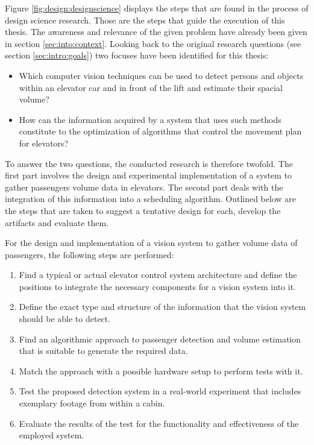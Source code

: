 Figure \ref{fig:design:designscience} displays the steps that are found in the process of design science research. 
Those are the steps that guide the execution of this thesis.
The awareness and relevance of the given problem have already been given in section \vref{sec:into:context}.
Looking back to the original research questions (see section \vref{sec:intro:goals}) two focuses have been identified for this thesis:

\begin{itemize}
    \item Which computer vision techniques can be used to detect persons and objects within an elevator car and in front of the lift and estimate their spacial volume?
    \item How can the information acquired by a system that uses such methods constitute to the optimization of algorithms that control the movement plan for elevators?
\end{itemize}


To answer the two questions, the conducted research is therefore twofold.
The first part involves the design and experimental implementation of a system to gather passengers volume data in elevators.
The second part deals with the integration of this information into a scheduling algorithm.
Outlined below are the steps that are taken to
suggest a tentative design for each, develop the artifacts and evaluate them.

For the  design and implementation of a vision system to gather volume data of passengers,
the following steps are performed:

\begin{enumerate}
    \item Find a typical or actual elevator control system architecture and define the positions to integrate the necessary components for a vision system into it.
    \item Define the exact type and structure of the information that the vision system should be able to detect.
    \item Find an algorithmic approach to  passenger detection and volume estimation that is suitable to generate the required data.
    \item Match the approach with a possible hardware setup to perform tests with it.
    \item Test the proposed detection system in a real-world experiment that includes  exemplary footage from within a cabin.
    \item Evaluate the results of the test for the functionality and effectiveness of the employed system.
\end{enumerate}

